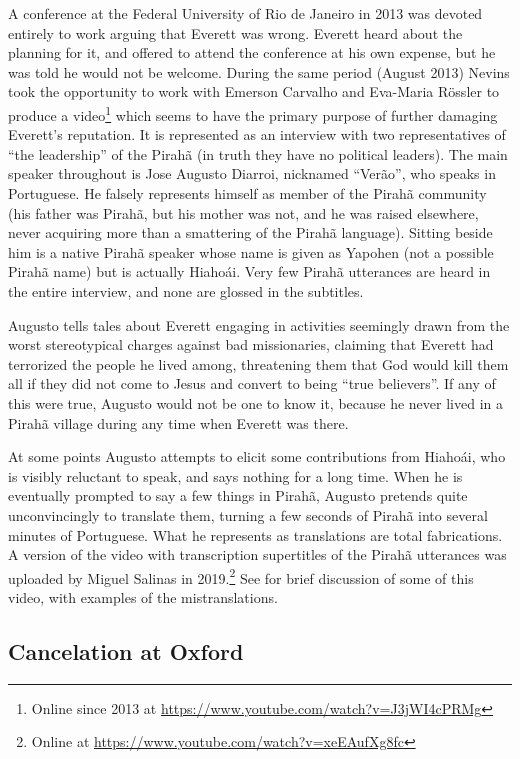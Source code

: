 \documentclass[output=paper,colorlinks,citecolor=brown
]{langscibook}
\begin{document}
A conference at the Federal University of Rio de Janeiro in 2013 was
devoted entirely to work arguing that Everett was wrong. Everett heard
about the planning for it, and offered to attend the conference at
his own expense, but he was told he would not be welcome. During the
same period (August 2013) Nevins took the opportunity to work with
Emerson Carvalho and Eva-Maria R{\"o}ssler to produce a video\footnote{%
   Online since 2013 at
   \url{https://www.youtube.com/watch?v=J3jWI4cPRMg}}
which seems to have the primary purpose of further damaging Everett's
reputation. It is represented as an interview with two representatives
of ``the leadership'' of the Pirah{\~a} (in truth they have no political
leaders). The main speaker throughout is Jose Augusto Diarroi, nicknamed
``Ver{\~a}o'', who speaks in Portuguese. He falsely represents himself as
member of the Pirah{\~a} community (his father was Pirah{\~a}, but
his mother was not, and he was raised elsewhere, never acquiring
more than a smattering of the Pirah{\~a} language). Sitting beside
him is a native Pirah{\~a} speaker whose name is given as Yapohen
(not a possible Pirah{\~a} name) but is actually Hiaho{\'a}i. Very
few Pirah{\~a} utterances are heard in the entire interview, and none
are glossed in the subtitles.

Augusto tells tales about Everett engaging in activities seemingly
drawn from the worst stereotypical charges against bad missionaries,
claiming that Everett had terrorized the people he lived among,
threatening them that God would kill them all if they did not come
to Jesus and convert to being ``true believers''. If any of this were
true, Augusto would not be one to know it, because he never lived in
a Pirah{\~a} village during any time when Everett was there.

At some points Augusto attempts to elicit some contributions from
Hiaho{\'a}i, who is visibly reluctant to speak, and says nothing for
a long time. When he is eventually prompted to say a few things in
Pirah{\~a}, Augusto pretends quite unconvincingly to translate them,
turning a few seconds of Pirah{\~a} into several minutes of Portuguese.
What he represents as translations are total fabrications. A version
of the video with transcription supertitles of the Pirah{\~a} utterances
was uploaded by Miguel Salinas in 2019.\footnote{%
   Online at \url{https://www.youtube.com/watch?v=xeEAufXg8fc}}
See \citet[781, fn.\,3]{EverGibs19} for brief
discussion of some of this video, with examples of the mistranslations.

\subsection{Cancelation at Oxford}
\label{sec-Oxford-cancelation}
\end{document}
